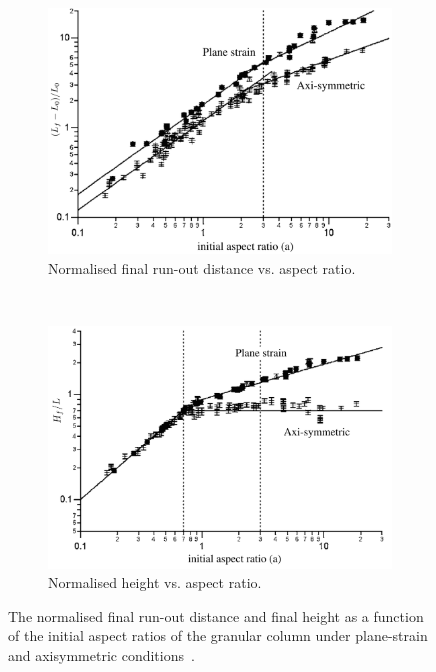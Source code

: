 \begin{figure}[tbhp]
\centering
	\begin{subfigure}[b]{0.85\textwidth}
	\centering
	\includegraphics[width=\textwidth]{Runout_Exp}
	\caption{Normalised final run-out distance vs. aspect ratio.}
	\label{fig:Runout_Exp}
	\end{subfigure} \\

	\begin{subfigure}[b]{0.85\textwidth}
	\centering
	\includegraphics[width=\textwidth]{Height_Exp}
	\caption{Normalised height vs. aspect ratio.}
	\label{fig:Height_Exp}
	\end{subfigure}
	\label{fig:Run_Height_Exp}
	\caption[Normalised final run-out and height as a function of initial aspect ratio for 
	plane-strain and axisymmetric collapse.]{The normalised final run-out 
	distance and final height 
	as a function of the initial aspect ratios of the granular column under plane-strain 
	and axisymmetric conditions~\citep{Lajeunesse2004}.}
\end{figure}

